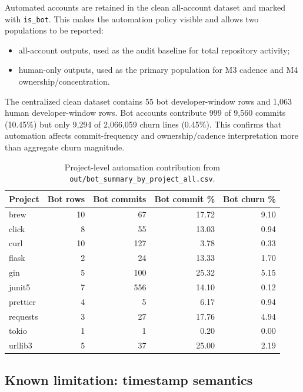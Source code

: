 Automated accounts are retained in the clean all-account dataset and marked with \texttt{is\_bot}. This makes the automation
policy visible and allows two populations to be reported:
\begin{itemize}[leftmargin=*]
  \item all-account outputs, used as the audit baseline for total repository activity;
  \item human-only outputs, used as the primary population for M3 cadence and M4 ownership/concentration.
\end{itemize}

The centralized clean dataset contains 55 bot developer-window rows and 1{,}063 human developer-window rows. Bot accounts contribute
999 of 9{,}560 commits (10.45\%) but only 9{,}294 of 2{,}066{,}059 churn lines (0.45\%). This confirms that automation affects
commit-frequency and ownership/cadence interpretation more than aggregate churn magnitude.

\begin{table}[H]
\centering
\scriptsize
\renewcommand{\arraystretch}{1.12}
\begin{tabular}{lrrrr}
\toprule
\textbf{Project} & \textbf{Bot rows} & \textbf{Bot commits} & \textbf{Bot commit \%} & \textbf{Bot churn \%} \\
\midrule
brew     & 10 & 67  & 17.72 & 9.10 \\
click    & 8  & 55  & 13.03 & 0.94 \\
curl     & 10 & 127 & 3.78  & 0.33 \\
flask    & 2  & 24  & 13.33 & 1.70 \\
gin      & 5  & 100 & 25.32 & 5.15 \\
junit5   & 7  & 556 & 14.10 & 0.12 \\
prettier & 4  & 5   & 6.17  & 0.94 \\
requests & 3  & 27  & 17.76 & 4.94 \\
tokio    & 1  & 1   & 0.20  & 0.00 \\
urllib3  & 5  & 37  & 25.00 & 2.19 \\
\bottomrule
\end{tabular}
\caption{Project-level automation contribution from \texttt{out/bot\_summary\_by\_project\_all.csv}.}
\label{tab:bot_cleaning_summary}
\end{table}

\subsection{Known limitation: timestamp semantics}
\label{sec:phase1_author_date_lim}

